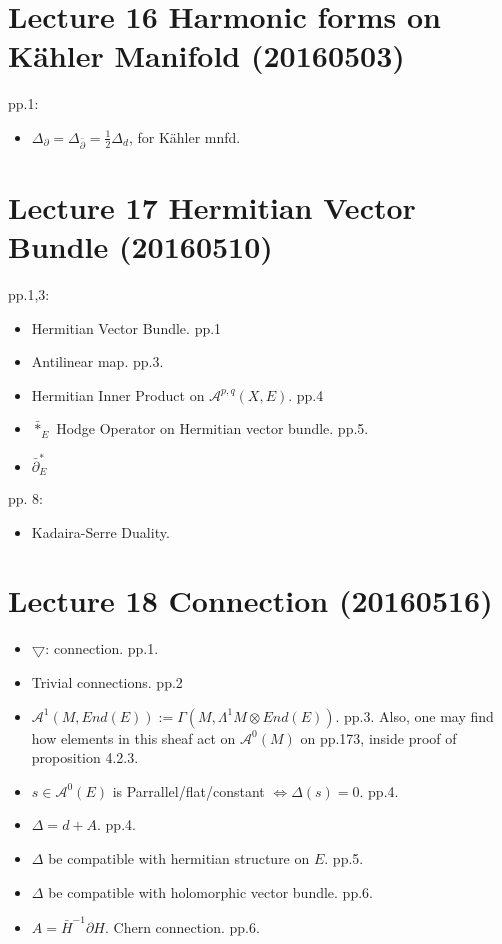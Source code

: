 \section{Lecture 16 Harmonic forms on K\"{a}hler Manifold (20160503)}

pp.1:
\begin{itemize}
    \item $\Delta_\partial = \Delta_{\bar{\partial}} = 
        \frac{1}{2}\Delta_d$, for K\"{a}hler mnfd.
\end{itemize}

\section{Lecture 17 Hermitian Vector Bundle (20160510)}
pp.1,3:
\begin{itemize}
    \item Hermitian Vector Bundle. pp.1
    \item Antilinear map. pp.3.
    \item Hermitian Inner Product on $\mathcal{A}^{p,q}(X,E)$. pp.4
    \item $\bar{*}_E$ Hodge Operator on Hermitian vector bundle. pp.5.
    \item $\bar{\partial}_E^*$
\end{itemize}
pp. 8:
\begin{itemize}
    \item Kadaira-Serre Duality.
\end{itemize}

\section{Lecture 18 Connection (20160516)}
\begin{itemize}
    \item $\bigtriangledown$: connection. pp.1.
    \item Trivial connections. pp.2
    \item $\mathcal{A}^1(M,End(E)):=\Gamma(M,\Lambda^1 M\otimes End(E))$. pp.3. Also, one may find how elements in this sheaf act on $\mathcal{A}^0(M)$ on pp.173, inside proof of proposition 4.2.3.
    \item $s\in \mathcal{A}^0(E)$ is Parrallel/flat/constant $\Leftrightarrow \Delta(s) = 0$. pp.4.
    \item $\Delta = d+A$. pp.4.
    \item $\Delta$ be compatible with hermitian structure on $E$. pp.5.
    \item $\Delta$ be compatible with holomorphic vector bundle. pp.6.
    \item $A=\bar{H}^{-1} \partial H$. Chern connection. pp.6.
\end{itemize}

